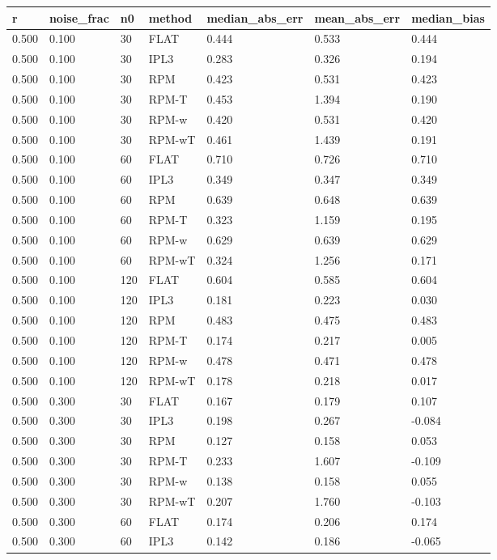 \begin{tabular}{lllllll}
\hline
r & noise\_frac & n0 & method & median\_abs\_err & mean\_abs\_err & median\_bias \\
\hline
0.500 & 0.100 & 30 & FLAT & 0.444 & 0.533 & 0.444 \\
0.500 & 0.100 & 30 & IPL3 & 0.283 & 0.326 & 0.194 \\
0.500 & 0.100 & 30 & RPM & 0.423 & 0.531 & 0.423 \\
0.500 & 0.100 & 30 & RPM-T & 0.453 & 1.394 & 0.190 \\
0.500 & 0.100 & 30 & RPM-w & 0.420 & 0.531 & 0.420 \\
0.500 & 0.100 & 30 & RPM-wT & 0.461 & 1.439 & 0.191 \\
0.500 & 0.100 & 60 & FLAT & 0.710 & 0.726 & 0.710 \\
0.500 & 0.100 & 60 & IPL3 & 0.349 & 0.347 & 0.349 \\
0.500 & 0.100 & 60 & RPM & 0.639 & 0.648 & 0.639 \\
0.500 & 0.100 & 60 & RPM-T & 0.323 & 1.159 & 0.195 \\
0.500 & 0.100 & 60 & RPM-w & 0.629 & 0.639 & 0.629 \\
0.500 & 0.100 & 60 & RPM-wT & 0.324 & 1.256 & 0.171 \\
0.500 & 0.100 & 120 & FLAT & 0.604 & 0.585 & 0.604 \\
0.500 & 0.100 & 120 & IPL3 & 0.181 & 0.223 & 0.030 \\
0.500 & 0.100 & 120 & RPM & 0.483 & 0.475 & 0.483 \\
0.500 & 0.100 & 120 & RPM-T & 0.174 & 0.217 & 0.005 \\
0.500 & 0.100 & 120 & RPM-w & 0.478 & 0.471 & 0.478 \\
0.500 & 0.100 & 120 & RPM-wT & 0.178 & 0.218 & 0.017 \\
0.500 & 0.300 & 30 & FLAT & 0.167 & 0.179 & 0.107 \\
0.500 & 0.300 & 30 & IPL3 & 0.198 & 0.267 & -0.084 \\
0.500 & 0.300 & 30 & RPM & 0.127 & 0.158 & 0.053 \\
0.500 & 0.300 & 30 & RPM-T & 0.233 & 1.607 & -0.109 \\
0.500 & 0.300 & 30 & RPM-w & 0.138 & 0.158 & 0.055 \\
0.500 & 0.300 & 30 & RPM-wT & 0.207 & 1.760 & -0.103 \\
0.500 & 0.300 & 60 & FLAT & 0.174 & 0.206 & 0.174 \\
0.500 & 0.300 & 60 & IPL3 & 0.142 & 0.186 & -0.065 \\

\end{tabular}
